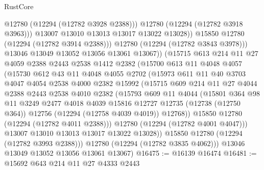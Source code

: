 \begin{lexlean}{RustCore}
\begin{coremodule}
                        @12780
                        (@12294 (@12782 @3928 @2388)))
                      @12780
                      (@12294 (@12782 @3918 @3963)))
                    @13007
                    @13010
                    @13013
                    @13017
                    @13022
                    @13028))
                @15850
                @12780
                (@12294 (@12782 @3914 @2388)))
              @12780
              (@12294 (@12782 @3843 @3978)))
            @13046
            @13049
            @13052
            @13056
            @13061
            @13067))
        (@15715
          @613
          @214
          @11
          @27
          @4059
          @2388
          @2443
          @2538
          @1412
          @2382
          (@15700
            @613
            @11
            @4048
            @4057
            (@15730
              @612
              @43
              @11
              @4048
              @4055
              @2702
              (@15973
                @611
                @11
                @40
                @3703
                @4047
                @4054
                @2538
                @4000
                @2382
                @15992
                (@15715
                  @609
                  @214
                  @11
                  @27
                  @4044
                  @2388
                  @2443
                  @2538
                  @4010
                  @2382
                  (@15793
                    @609
                    @11
                    @4044
                    (@15801
                      @364
                      @98
                      @11
                      @3249
                      @2477
                      @4018
                      @4039
                      @15816
                      @12727
                      @12735
                      (@12738 (@12750 @364))
                      @12756
                      (@12294 (@12758 @4039 @4019))
                      @12768))
                  @15850
                  @12780
                  (@12294 (@12782 @4011 @2388)))
                @12780
                (@12294 (@12782 @4001 @4047)))
              @13007
              @13010
              @13013
              @13017
              @13022
              @13028))
          @15850
          @12780
          (@12294 (@12782 @3993 @2388)))
        @12780
        (@12294 (@12782 @3835 @4062)))
      @13046
      @13049
      @13052
      @13056
      @13061
      @13067)
@16475 := @16139 @16474
@16481 := @15692 @643 @214 @11 @27 @4333 @2443

\end{coremodule}
\end{lexlean}
